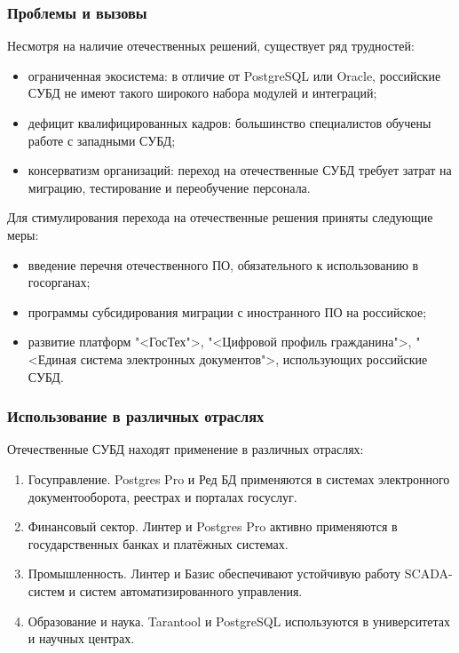 \subsubsection{Проблемы и вызовы}

Несмотря на наличие отечественных решений, существует ряд трудностей:
\begin{itemize}
	\item ограниченная экосистема: в отличие от PostgreSQL или Oracle, российские СУБД не имеют такого широкого набора модулей и интеграций;
	\item дефицит квалифицированных кадров: большинство специалистов обучены работе с западными СУБД;
	\item консерватизм организаций: переход на отечественные СУБД требует затрат на миграцию, тестирование и переобучение персонала.
\end{itemize}

Для стимулирования перехода на отечественные решения приняты следующие меры:
\begin{itemize}
	\item введение перечня отечественного ПО, обязательного к использованию в госорганах;
	\item программы субсидирования миграции с иностранного ПО на российское;
	\item развитие платформ "<ГосТех">, "<Цифровой профиль гражданина">, "<Единая система электронных документов">, использующих российские СУБД.
\end{itemize}

\subsubsection{Использование в различных отраслях}

Отечественные СУБД находят применение в различных отраслях:

\begin{enumerate}
	\item Госуправление. Postgres Pro и Ред БД применяются в системах электронного документооборота, реестрах и порталах госуслуг.
	\item Финансовый сектор. Линтер и Postgres Pro активно применяются в государственных банках и платёжных системах.
	\item Промышленность. Линтер и Базис обеспечивают устойчивую работу SCADA-систем и систем автоматизированного управления.
	\item Образование и наука. Tarantool и PostgreSQL используются в университетах и научных центрах.
\end{enumerate}

